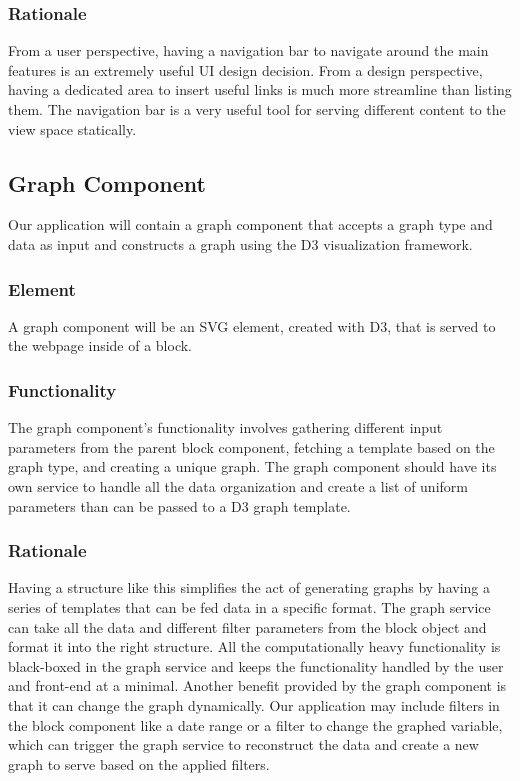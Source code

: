 \documentclass[journal,10pt,onecolumn,compsoc]{IEEEtran}
\begin{document}
			\subsubsection{Rationale}
				From a user perspective, having a navigation bar to navigate around the main features is an extremely useful UI design decision. 
				From a design perspective, having a dedicated area to insert useful links is much more streamline than listing them. 
				The navigation bar is a very useful tool for serving different content to the view space statically.
		
		\subsection{Graph Component}
			Our application will contain a graph component that accepts a graph type and data as input and constructs a graph using the D3 visualization framework.
			\subsubsection{Element}
				A graph component will be an SVG element, created with D3, that is served to the webpage inside of a block. 
			\subsubsection{Functionality}
				The graph component's functionality involves gathering different input parameters from the parent block component, fetching a template based on the graph type, and creating a unique graph. 
				The graph component should have its own service to handle all the data organization and create a list of uniform parameters than can be passed to a D3 graph template.
			\subsubsection{Rationale}
				Having a structure like this simplifies the act of generating graphs by having a series of templates that can be fed data in a specific format. 
				The graph service can take all the data and different filter parameters from the block object and format it into the right structure. 
				All the computationally heavy functionality is black-boxed in the graph service and keeps the functionality handled by the user and front-end at a minimal. 
				Another benefit provided by the graph component is that it can change the graph dynamically. 
				Our application may include filters in the block component like a date range or a filter to change the graphed variable, which can trigger the graph service to reconstruct the data and create a new graph to serve based on the applied filters.
		
\end{document}
